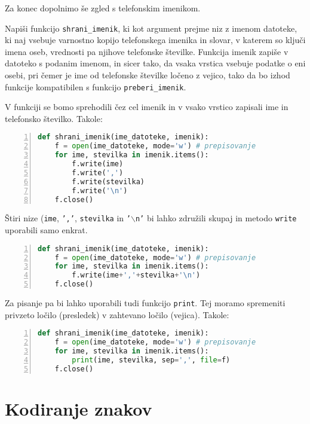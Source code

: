 Za konec dopolnimo še zgled s telefonskim imenikom.
\begin{zgled}
Napiši funkcijo \texttt{shrani\_imenik}, ki kot argument prejme niz z imenom datoteke, ki naj vsebuje varnostno kopijo telefonskega imenika in slovar, v katerem so ključi imena oseb, vrednosti pa njihove telefonske številke. Funkcija imenik zapiše v datoteko s podanim imenom, in sicer tako, da vsaka vrstica vsebuje podatke o eni osebi, pri čemer je ime od telefonske številke ločeno z vejico, tako da bo izhod funkcije kompatibilen s funkcijo \texttt{preberi\_imenik}.
\end{zgled}
\begin{resitev}
V funkciji se bomo sprehodili čez cel imenik in v vsako vrstico zapisali ime in telefonsko številko. Takole:
\begin{lstlisting}[language=Python, showstringspaces=false,numbers=left]
def shrani_imenik(ime_datoteke, imenik):
    f = open(ime_datoteke, mode='w') # prepisovanje
    for ime, stevilka in imenik.items():
        f.write(ime) 
        f.write(',')
        f.write(stevilka)
        f.write('\n')
    f.close()
\end{lstlisting}
Štiri nize (\texttt{ime}, \texttt{','}, \texttt{stevilka} in \texttt{'$\backslash$n'} bi lahko združili skupaj in metodo \texttt{write} uporabili samo enkrat.
\begin{lstlisting}[language=Python, showstringspaces=false,numbers=left]
def shrani_imenik(ime_datoteke, imenik):
    f = open(ime_datoteke, mode='w') # prepisovanje
    for ime, stevilka in imenik.items():
        f.write(ime+','+stevilka+'\n')
    f.close()
\end{lstlisting}
Za pisanje pa bi lahko uporabili tudi funkcijo \texttt{print}. Tej moramo spremeniti privzeto ločilo (presledek) v zahtevano ločilo (vejica). Takole:
\begin{lstlisting}[language=Python, showstringspaces=false,numbers=left]
def shrani_imenik(ime_datoteke, imenik):
    f = open(ime_datoteke, mode='w') # prepisovanje
    for ime, stevilka in imenik.items():
        print(ime, stevilka, sep=',', file=f)
    f.close()
\end{lstlisting}
\end{resitev}

\section{Kodiranje znakov}
